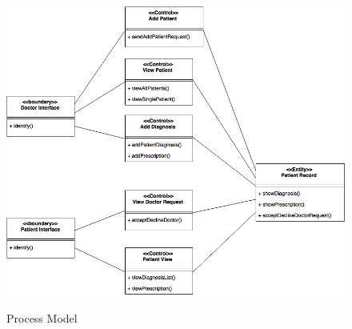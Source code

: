 \begin{figure}[h!]
\centering
\caption{Process Model}
\includegraphics[width=16cm]{Process.png}
\label{Basic Micro-services architecture pattern}
\end{figure}

\FloatBarrier